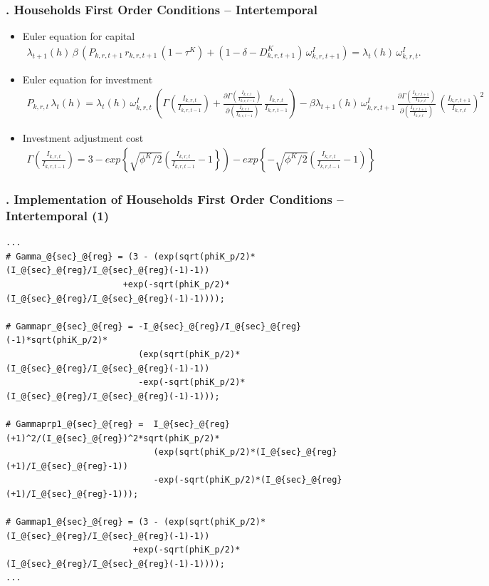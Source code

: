\documentclass[11pt,aspectratio=169]{beamer}
\begin{document}
\begin{frame}
\frametitle{{\thesection.\thesubsection} Households First Order Conditions -- Intertemporal}
\scriptsize
\begin{itemize}
\item Euler equation for capital
\begin{align*}
\lambda_{t+1}(h) \, \beta \, \left(P_{k,r,t+1} \, r_{k,r,t+1} \, (1 - \tau^K)+(1 - \delta - D^{K}_{k,r,t+1}) \, \omega^{I}_{k,r,t+1} \right) = \lambda_{t}(h) \, \omega^{I}_{k,r,t}.
\end{align*}
\item Euler equation for investment
\begin{align*}
P_{k,r,t} \, \lambda_{t}(h) = \lambda_{t}(h) \, \omega^{I}_{k,r,t} \, \left(\Gamma(\frac{I_{k,r,t}}{I_{k,r,t-1}})+\frac{\partial \Gamma(\frac{I_{k,r,t}}{I_{k,r,t-1}})}{\partial (\frac{I_{k,r,t}}{I_{k,r,t-1}})} \, \frac{I_{k,r,t}}{I_{k,r,t-1}} \right) - \beta \lambda_{t+1}(h) \, \omega^{I}_{k,r,t+1} \, \frac{\partial \Gamma(\frac{I_{k,r,t+1}}{I_{k,r,t}})}{\partial (\frac{I_{k,r,t+1}}{I_{k,r,t}})} \, \left(\frac{I_{k,r,t+1}}{I_{k,r,t}}\right)^2
\end{align*}
\item Investment adjustment cost
\begin{align*}
\Gamma(\frac{I_{k,r,t}}{I_{k,r,t-1}}) = 3 - exp\left\lbrace\sqrt{\phi^{K}/2}\left(\frac{I_{k,r,t}}{I_{k,r,t-1}}-1\right\rbrace\right) - exp\left\lbrace-\sqrt{\phi^{K}/2}\left(\frac{I_{k,r,t}}{I_{k,r,t-1}}-1\right)\right\rbrace
\end{align*}
\end{itemize}
\end{frame}


\begin{frame}[fragile]
\frametitle{{\thesection.\thesubsection} Implementation of Households First Order Conditions -- Intertemporal (1)}

\begin{lstlisting}[frame = single]
...
# Gamma_@{sec}_@{reg} = (3 - (exp(sqrt(phiK_p/2)*(I_@{sec}_@{reg}/I_@{sec}_@{reg}(-1)-1))
                       +exp(-sqrt(phiK_p/2)*(I_@{sec}_@{reg}/I_@{sec}_@{reg}(-1)-1))));
												
# Gammapr_@{sec}_@{reg} = -I_@{sec}_@{reg}/I_@{sec}_@{reg}(-1)*sqrt(phiK_p/2)*
                          (exp(sqrt(phiK_p/2)*(I_@{sec}_@{reg}/I_@{sec}_@{reg}(-1)-1))
                          -exp(-sqrt(phiK_p/2)*(I_@{sec}_@{reg}/I_@{sec}_@{reg}(-1)-1)));
													
# Gammaprp1_@{sec}_@{reg} =  I_@{sec}_@{reg}(+1)^2/(I_@{sec}_@{reg})^2*sqrt(phiK_p/2)*
                             (exp(sqrt(phiK_p/2)*(I_@{sec}_@{reg}(+1)/I_@{sec}_@{reg}-1)) 
                             -exp(-sqrt(phiK_p/2)*(I_@{sec}_@{reg}(+1)/I_@{sec}_@{reg}-1)));
														
# Gammap1_@{sec}_@{reg} = (3 - (exp(sqrt(phiK_p/2)*(I_@{sec}_@{reg}/I_@{sec}_@{reg}(-1)-1))
                         +exp(-sqrt(phiK_p/2)*(I_@{sec}_@{reg}/I_@{sec}_@{reg}(-1)-1))));
...
\end{lstlisting}
\end{frame}
\end{document}
